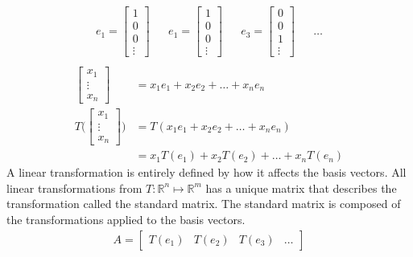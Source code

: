 \documentclass{article}
\theoremstyle{mytheoremstyle}
\theoremstyle{mytheoremstyle}
\theoremstyle{myproblemstyle}
\begin{document}
    \begin{align*}
        e_1 = \begin{bmatrix}
            1 \\ 0 \\ 0 \\ \vdots
        \end{bmatrix} &&
        e_1 = \begin{bmatrix}
            1 \\ 0 \\ 0 \\ \vdots
        \end{bmatrix} &&
        e_3 = \begin{bmatrix}
            0 \\ 0 \\ 1 \\ \vdots
        \end{bmatrix} && \dots \\
    \end{align*}
    \begin{align*}
        \begin{bmatrix}
            x_1 \\ \vdots \\ x_n
        \end{bmatrix} &=
        x_1e_1 + x_2e_2 + \dots + x_ne_n \\
        T\bigg(\begin{bmatrix}
            x_1 \\ \vdots \\ x_n
        \end{bmatrix}\bigg) &= T(x_1e_1+x_2e_2+\dots+x_ne_n) \\
        &= x_1T(e_1) + x_2T(e_2) + \dots + x_nT(e_n)
    \end{align*}
    A linear transformation is entirely defined by how it affects the basis
    vectors. All linear transformations from $T: \mathbb{R}^n \mapsto
    \mathbb{R}^m$ has a unique matrix that describes the transformation called
    the standard matrix. The standard matrix is composed of the transformations
    applied to the basis vectors.
    \begin{align*}
        A = \begin{bmatrix}
            T(e_1) & T(e_2) & T(e_3) & \dots
        \end{bmatrix}
    \end{align*}
\end{document}

